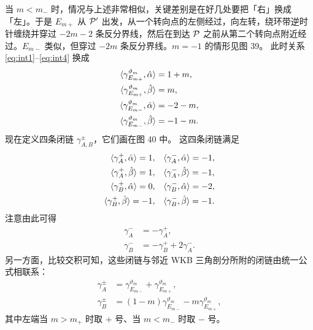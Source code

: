 当 $m<m_-$ 时，情况与上述非常相似，关键差别是在好几处要把「右」换成「左」。于是 $E_{m+}$ 从 $\mathcal{P}'$ 出发，从一个转向点的左侧经过，向左转，绕环带逆时针缠绕并穿过 $-2m-2$ 条反分界线，然后在到达 $\mathcal{P}$ 之前从第二个转向点附近经过。$E_{m-}$ 类似，但穿过 $-2m$ 条反分界线。$m=-1$ 的情形见图 39。%
此时关系 \eqref{eq:int1}–\eqref{eq:int4} 换成
\begin{align}
\langle \gamma_{E_{m+}}^{\vartheta_m}, \hat\alpha \rangle &= 1+m, \label{eq:int5} \\
\langle \gamma_{E_{m+}}^{\vartheta_m}, \hat\beta \rangle &= m, \\
\langle \gamma_{E_{m-}}^{\vartheta_m}, \hat\alpha \rangle &= -2-m, \\
\langle \gamma_{E_{m-}}^{\vartheta_m}, \hat\beta \rangle &= -1-m. \label{eq:int8}
\end{align}
现在定义四条闭链 $\gamma^\pm_{A,B}$，它们画在图 40 中。%
这四条闭链满足
\begin{align}
\langle \gamma^+_A, \hat\alpha \rangle = 1, \quad & \langle \gamma^-_A, \hat\alpha \rangle = -1, \\
\langle \gamma^+_A, \hat\beta \rangle = 1, \quad & \langle \gamma^-_A, \hat\beta \rangle = -1, \\
\langle \gamma^+_B, \hat\alpha \rangle = 0, \quad & \langle \gamma^-_B, \hat\alpha \rangle = -2, \\
\langle \gamma^+_B, \hat\beta \rangle = -1, \quad & \langle \gamma^-_B, \hat\beta \rangle = -1.
\end{align}
注意由此可得
\begin{align}
\gamma^-_A &= - \gamma^+_A, \label{eq:compare-a} \\
\gamma^-_B &= - \gamma^+_B + 2 \gamma^-_A. \label{eq:compare-b}
\end{align}
另一方面，比较交积可知，这些闭链与邻近 WKB 三角剖分所附的闭链由统一公式相联系：
\begin{align}
\gamma^\pm_A & = \gamma^{\vartheta_m}_{E_{m-}} + \gamma^{\vartheta_m}_{E_{m+}}, \label{eq:gamA} \\
\gamma^\pm_B & = (1-m) \gamma^{\vartheta_m}_{E_{m-}} - m \gamma^{\vartheta_m}_{E_{m+}}, \label{eq:gamB}
\end{align}
其中左端当 $m>m_+$ 时取 $+$ 号、当 $m<m_-$ 时取 $-$ 号。

